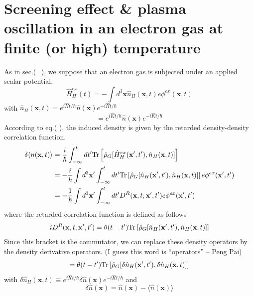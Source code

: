 \section[Screening and plasma oscillations at finite temperature]{Screening effect \& plasma oscillation in an electron gas at finite (or high) temperature}
 As in sec.(\_), we suppose that an electron gas is subjected under an applied scalar potential.
\begin{equation}
\hat H^{ex}_H(t)=-\int d^3\mathbf x \hat n_H(\mathbf x,t) e\phi^{ex}(\mathbf x,t)
\end{equation}
with $\hat n_H(\mathbf x ,t)=e^{i \hat H t/\hbar} \hat n(\mathbf x)e^{-i \hat Ht/\hbar}$
\begin{equation}
[\hat n(\mathbf x),\hat N]=e^{i \hat K t/\hbar} \hat n(\mathbf x)e^{-i \hat Kt/\hbar}
\end{equation}
According to eq.( ), the induced density is given by the retarded density-density correlation function.
\begin{equation}
\begin{aligned}
\delta\langle n(\mathbf x,t)\rangle &=\frac{i}{\hbar} \int_{-\infty}^t dt' \text{Tr}\left[ \hat \rho_G[\hat H^{ex}_H(\mathbf x',t'),\hat n_H(\mathbf x,t)] \right]\\
&=-\frac{i}{\hbar}\int d^3 \mathbf x' \int_{-\infty}^t dt' \text{Tr}\left[ \hat \rho_G[\hat n_H(\mathbf x',t'),\hat n_H(\mathbf x,t)] \right] e\phi^{ex}(\mathbf x',t')\\
&=-\frac{1}{\hbar} \int d^3 \mathbf x' \int_{-\infty}^t dt' D^R(\mathbf x,t;\mathbf x',t')e\phi^{ex}(\mathbf x',t')
\end{aligned}
\end{equation}
where the retarded correlation function is defined as follows
\[
iD^R(\mathbf x,t;\mathbf x',t')=\theta(t-t')\text{Tr}\left[ \hat \rho_G[\hat n_H(\mathbf x',t'),\hat n_H(\mathbf x,t)] \right]
\]
Since this bracket is the commutator, we can replace these density operators by the density derivative operators. (I guess this word is ``operators'' -- Peng Pai)
\begin{equation}
=\theta(t-t')\text{Tr} \left[ \hat \rho_G[\delta \hat n_H(\mathbf x',t'),\delta \hat n_H(\mathbf x,t)] \right]
\end{equation}
with $\delta \hat n_H(\mathbf x,t)\equiv e^{i\hat K t/\hbar}\delta \hat n(\mathbf x)e^{-i\hat Kt/\hbar}$ and
\begin{equation}\tag{4.9.4'}
\delta \hat n(\mathbf x)=\hat n(\mathbf x)-\langle \hat n(\mathbf x)\rangle
\end{equation}
